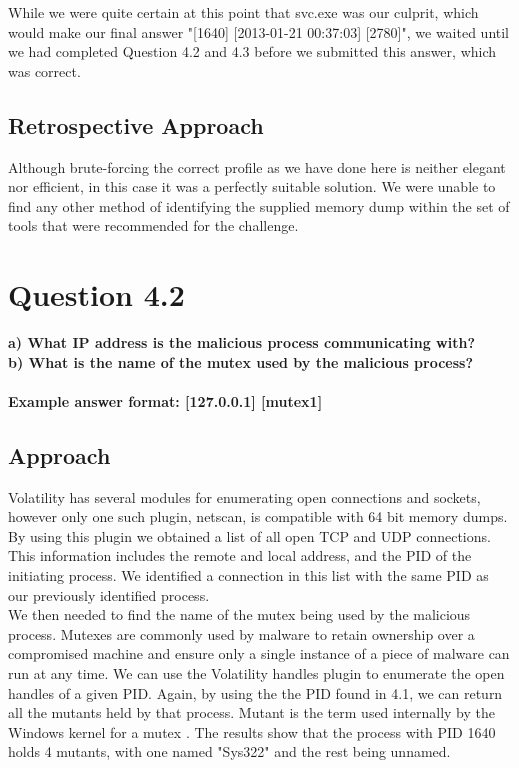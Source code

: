 While we were quite certain at this point that svc.exe was our culprit, which would make our final answer "[1640] [2013-01-21 00:37:03] [2780]", we waited until we had completed Question 4.2 and 4.3 before we submitted this answer, which was correct.

\subsection{Retrospective Approach}
Although brute-forcing the correct profile as we have done here is neither elegant nor efficient, in this case it was a perfectly suitable solution. We were unable to find any other method of identifying the supplied memory dump within the set of tools that were recommended for the challenge.
\section{Question 4.2}
\textbf{a) What IP address is the malicious process communicating with?
\\b) What is the name of the mutex used by the malicious process?
\\\\
Example answer format: [127.0.0.1] [mutex1]}
\subsection{Approach}

Volatility has several modules for enumerating open connections and sockets, however only one such plugin, netscan, is compatible with 64 bit memory dumps. By using this plugin we obtained a list of all open TCP and UDP connections. This information includes the remote and local address, and the PID of the initiating process. We identified a connection in this list with the same PID as our previously identified process. \\

We then needed to find the name of the mutex being used by the malicious process. Mutexes are commonly used by malware to retain ownership over a compromised machine and ensure only a single instance of a piece of malware can run at any time. We can use the Volatility handles plugin to enumerate the open handles of a given PID. Again, by using the the PID found in 4.1, we can return all the mutants held by that process. Mutant is the term used internally by the Windows kernel for a mutex \cite[57]{winint}. The results show that the process with PID 1640 holds 4 mutants, with one named "Sys322" and the rest being unnamed.\\

